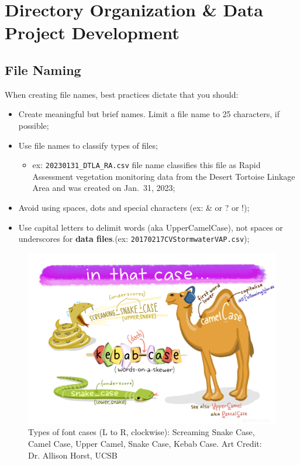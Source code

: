 \documentclass[
]{book}
\providecommand{\tightlist}{%
  \setlength{\itemsep}{0pt}\setlength{\parskip}{0pt}}
\begin{document}
\hypertarget{organization}{%
\chapter{Directory Organization \& Data Project Development}\label{organization}}

\hypertarget{file-naming}{%
\section{File Naming}\label{file-naming}}

When creating file names, best practices dictate that you should:

\begin{itemize}
\tightlist
\item
  Create meaningful but brief names. Limit a file name to 25 characters, if possible;
\item
  Use file names to classify types of files;

  \begin{itemize}
  \tightlist
  \item
    ex: \texttt{20230131\_DTLA\_RA.csv} file name classifies this file as Rapid Assessment vegetation monitoring data from the Desert Tortoise Linkage Area and was created on Jan.~31, 2023;
  \end{itemize}
\item
  Avoid using spaces, dots and special characters (ex: \& or ? or !);
\item
  Use capital letters to delimit words (aka UpperCamelCase), not spaces or underscores for \textbf{data files}.(ex: \texttt{20170217CVStormwaterVAP.csv});
\end{itemize}

\begin{figure}

{\centering \includegraphics[width=0.75\linewidth]{images/case_horst} 

}

\caption{Types of font cases (L to R, clockwise): Screaming Snake Case, Camel Case, Upper Camel, Snake Case, Kebab Case. Art Credit: Dr. Allison Horst, UCSB}\label{fig:case}
\end{figure}
\end{document}
